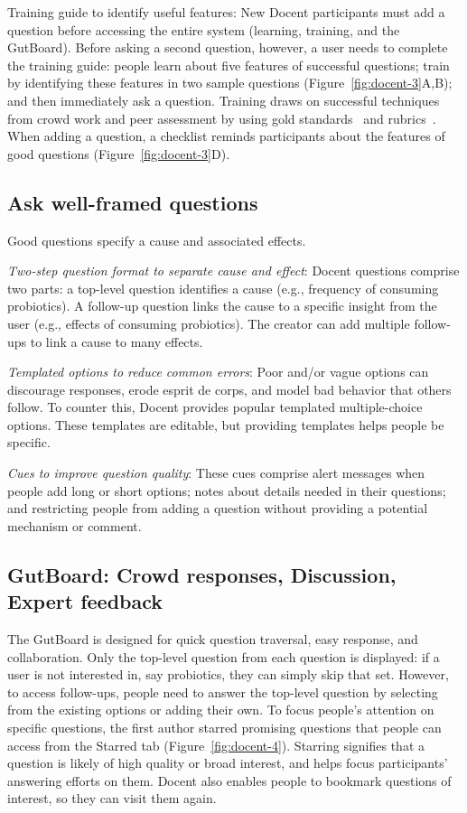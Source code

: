 Training guide to identify useful features: New Docent participants must add a question before accessing the entire system (learning, training, and the GutBoard). Before asking a second question, however, a user needs to complete the training guide: people learn about five features of successful questions; train by identifying these features in two sample questions (Figure~\ref{fig:docent-3}A,B); and then immediately ask a question. Training draws on successful techniques from crowd work and peer assessment by using gold standards~\cite{Kittur2013} and rubrics~\cite{Andrade2005}. When adding a question, a checklist reminds participants about the features of good questions (Figure~\ref{fig:docent-3}D).

\subsection{Ask well-framed questions }
Good questions specify a cause and associated effects.

\textit{Two-step question format to separate cause and effect}: Docent questions comprise two parts: a top-level question identifies a cause (e.g., frequency of consuming probiotics). A follow-up question links the cause to a specific insight from the user (e.g., effects of consuming probiotics). The creator can add multiple follow-ups to link a cause to many effects.

\textit{Templated options to reduce common errors}: Poor and/or vague options can discourage responses, erode esprit de corps, and model bad behavior that others follow. To counter this, Docent provides popular templated multiple-choice options. These templates are editable, but providing templates helps people be specific.

\textit{Cues to improve question quality}: These cues comprise alert messages when people add long or short options; notes about details needed in their questions; and restricting people from adding a question without providing a potential mechanism or comment.

\subsection{GutBoard: Crowd responses, Discussion, Expert feedback}
The GutBoard is designed for quick question traversal, easy response, and collaboration. Only the top-level question from each question is displayed: if a user is not interested in, say probiotics, they can simply skip that set. However, to access follow-ups, people need to answer the top-level question by selecting from the existing options or adding their own. To focus people’s attention on specific questions, the first author starred promising questions that people can access from the Starred tab (Figure~\ref{fig:docent-4}). Starring signifies that a question is likely of high quality or broad interest, and helps focus participants’ answering efforts on them. Docent also enables people to bookmark questions of interest, so they can visit them again. 


